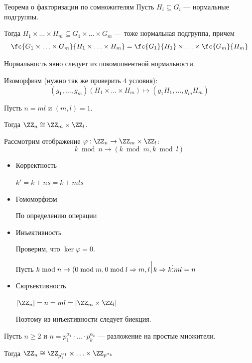 \begin{thrm}{Теорема о факторизации по сомножителям}{}
    Пусть \( H_i \subseteq G_i \) --- нормальные подгруппы.

    Тогда \( H_1 \times \ldots \times H_m \subseteq G_1 \times \ldots \times G_m \)
    --- тоже нормальная подгруппа, причем
    \[
        \fc{G_1 \times \ldots \times G_m}{H_1 \times \ldots \times H_m}
        =
        \fc{G_1}{H_1} \times \ldots \times \fc{G_m}{H_m}
    \]
\end{thrm}

Нормальность явно следует из покомпонентной нормальности.

Изоморфизм (нужно так же проверить \( 4 \) условия):
\[
    (g_1, \ldots, g_m) (H_1 \times \ldots \times H_m) \mapsto (g_1 H_1, \ldots, g_m H_m)
\]

\begin{thrm}{}{}
    Пусть \( n = ml \) и \( (m, l) = 1 \).

    Тогда \( \ZZ_n \cong \ZZ_m \times \ZZ_l \).
\end{thrm}

Рассмотрим отображение \( \varphi : \ZZ_n \to \ZZ_m \times \ZZ_l \):
\[
    k \bmod n \to (k \bmod m, k \bmod l)
\]

\begin{itemize}
    \item
        Корректность

        \( k' = k + ns = k + mls \)
    \item
        Гомоморфизм

        По определению операции
    \item
        Инъективность

        Проверим, что \( \ker \varphi = 0 \).

        Пусть \( k \bmod n \to (0 \bmod m, 0 \bmod l \Rightarrow m, l \: \vline \: k \Rightarrow k \vdots ml = n \)
    \item
        Сюръективность

        \( |\ZZ_n| = n = ml = |\ZZ_m \times \ZZ_l| \)

        Поэтому из инъективности следует биекция.
\end{itemize}

\begin{coroll}{}{}
    Пусть \( n \geq 2 \) и \( n = p_1^{\alpha_1} \cdot \ldots \cdot p_k^{\alpha_k} \) --- разложение на простые множители.

    Тогда \( \ZZ_n \cong \ZZ_{p_1^{\alpha_1}} \times \ldots \times \ZZ_{p^{\alpha_k}} \)
\end{coroll}


